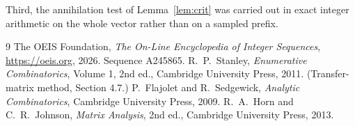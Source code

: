 \documentclass[11pt,a4paper]{article}
\theoremstyle{plain}
\theoremstyle{definition}
\begin{document}
Third, the annihilation test of Lemma~\ref{lem:crit} was carried out in exact integer
arithmetic on the whole vector rather than on a sampled prefix.

\begin{thebibliography}{9}
 The OEIS Foundation, \emph{The On-Line Encyclopedia of Integer
Sequences}, \url{https://oeis.org}, 2026. Sequence A245865.
 R.~P.~Stanley, \emph{Enumerative Combinatorics}, Volume 1, 2nd ed.,
Cambridge University Press, 2011. (Transfer-matrix method, Section 4.7.)
 P.~Flajolet and R.~Sedgewick, \emph{Analytic Combinatorics}, Cambridge
University Press, 2009.
 R.~A.~Horn and C.~R.~Johnson, \emph{Matrix Analysis}, 2nd ed., Cambridge
University Press, 2013.
\end{thebibliography}
\end{document}
